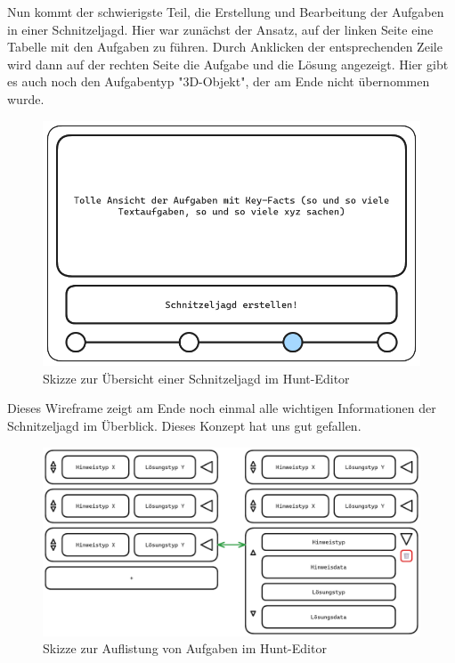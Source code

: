 Nun kommt der schwierigste Teil, die Erstellung und Bearbeitung der Aufgaben in einer Schnitzeljagd. Hier war zunächst der Ansatz, auf der linken Seite eine Tabelle mit den Aufgaben zu führen. Durch Anklicken der entsprechenden Zeile wird dann auf der rechten Seite die Aufgabe und die Lösung angezeigt. Hier gibt es auch noch den Aufgabentyp "3D-Objekt", der am Ende nicht übernommen wurde. 

\begin{figure}[H]
  \centering
  \includegraphics[width=1\textwidth]{images/wireframing/PrAr_Scavhunt_Wireframing-2.4.png}
  \caption{Skizze zur Übersicht einer Schnitzeljagd im Hunt-Editor}
  \label{fig:wireframing-frontend-hunt-editor-6}
\end{figure}

Dieses Wireframe zeigt am Ende noch einmal alle wichtigen Informationen der Schnitzeljagd im Überblick. Dieses Konzept hat uns gut gefallen. 

\begin{figure}[H]
  \centering
  \includegraphics[width=1\textwidth]{images/wireframing/PrAr_Scavhunt_Wireframing-3.png}
  \caption{Skizze zur Auflistung von Aufgaben im Hunt-Editor}
  \label{fig:wireframing-frontend-hunt-editor-7}
\end{figure}

